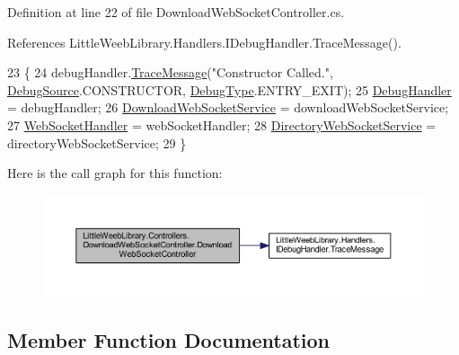 Definition at line 22 of file Download\+Web\+Socket\+Controller.\+cs.



References Little\+Weeb\+Library.\+Handlers.\+I\+Debug\+Handler.\+Trace\+Message().


\begin{DoxyCode}
23         \{
24             debugHandler.\mbox{\hyperlink{interface_little_weeb_library_1_1_handlers_1_1_i_debug_handler_a2e405bc3492e683cd3702fae125221bc}{TraceMessage}}(\textcolor{stringliteral}{"Constructor Called."}, 
      \mbox{\hyperlink{namespace_little_weeb_library_1_1_handlers_a2a6ca0775121c9c503d58aa254d292be}{DebugSource}}.CONSTRUCTOR, \mbox{\hyperlink{namespace_little_weeb_library_1_1_handlers_ab66019ed40462876ec4e61bb3ccb0a62}{DebugType}}.ENTRY\_EXIT);
25             \mbox{\hyperlink{class_little_weeb_library_1_1_handlers_1_1_debug_handler}{DebugHandler}} = debugHandler;
26             \mbox{\hyperlink{class_little_weeb_library_1_1_services_1_1_download_web_socket_service}{DownloadWebSocketService}} = downloadWebSocketService;
27             \mbox{\hyperlink{class_little_weeb_library_1_1_handlers_1_1_web_socket_handler}{WebSocketHandler}} = webSocketHandler;
28             \mbox{\hyperlink{class_little_weeb_library_1_1_services_1_1_directory_web_socket_service}{DirectoryWebSocketService}} = directoryWebSocketService;
29         \}
\end{DoxyCode}
Here is the call graph for this function\+:\nopagebreak
\begin{figure}[H]
\begin{center}
\leavevmode
\includegraphics[width=350pt]{class_little_weeb_library_1_1_controllers_1_1_download_web_socket_controller_adb8f6706c45d35e72ffb9cca7e768605_cgraph}
\end{center}
\end{figure}


\subsection{Member Function Documentation}
\mbox{\label{class_little_weeb_library_1_1_controllers_1_1_download_web_socket_controller_a9e5e421ed57b8b2a294e17d93d027c53}} 
